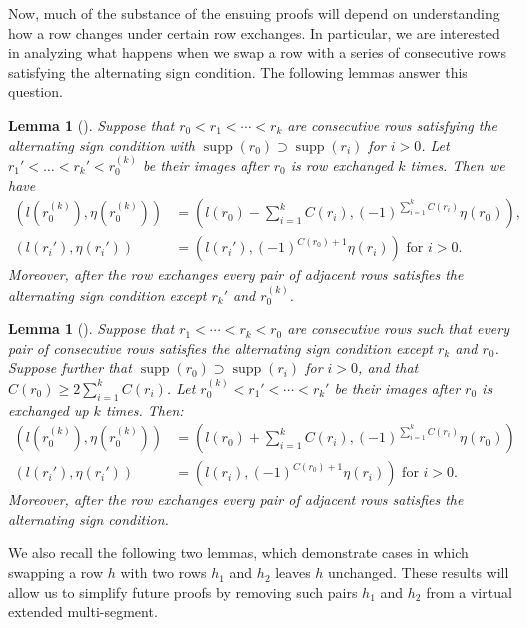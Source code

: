 \documentclass[11pt,letterpaper]{amsart}
\newtheorem{lemma}[thm]{Lemma}
\DeclareMathOperator{\supp}{supp}
\numberwithin{equation}{section}
\begin{document}
Now, much of the substance of the ensuing proofs will depend on understanding how a row changes under certain row exchanges. In particular, we are interested in analyzing what happens when we swap a row with a series of consecutive rows satisfying the alternating sign condition. The following lemmas answer this question.

\begin{lemma}[{\cite[Lemma 4.15]{HKT26}}]
\label{big swap down}
    Suppose that $r_0 < r_1 < \cdots < r_k$ are consecutive rows satisfying the alternating sign condition with $\supp(r_0) \supset \supp(r_i)$ for $i > 0$. Let $r_1' < \dots < r_k' < r_0^{(k)}$ be their images after $r_0$ is row exchanged $k$ times. Then we have
    \begin{align*}
        (l(r_0^{(k)}), \eta(r_0^{(k)})) &= \left(l(r_0) - \sum_{i=1}^k C(r_i), (-1)^{\sum_{i=1}^k C(r_i)} \eta(r_0) \right), \\
        (l(r_i'), \eta(r_i')) &= (l(r_i'), (-1)^{C(r_0)+1} \eta(r_i)) \text{ for } i >0.
    \end{align*}
    Moreover, after the row exchanges every pair of adjacent rows satisfies the alternating sign condition except $r_k'$ and $r_0^{(k)}$.
\end{lemma}

\begin{lemma}[{\cite[Lemma 4.16]{HKT26}}]
\label{big swap up}
    Suppose that $r_1 < \cdots < r_k < r_0$ are consecutive rows such that every pair of consecutive rows satisfies the alternating sign condition except $r_k$ and $r_0$. Suppose further that $\supp(r_0) \supset \supp(r_i)$ for $i > 0$, and that $C(r_0) \geq 2 \sum_{i = 1}^k C(r_i)$. Let $r_0^{(k)} < r_1' < \cdots < r_k'$ be their images after $r_0$ is exchanged up $k$ times. Then:
    \begin{align*}
        (l(r_0^{(k)}), \eta(r_0^{(k)})) &= \left(l(r_0) + \sum_{i=1}^k C(r_i), (-1)^{\sum_{i=1}^k C(r_i)} \eta(r_0) \right) \\
        (l(r_i'), \eta(r_i')) &= (l(r_i), (-1)^{C(r_0) + 1} \eta(r_i)) \text{ for } i > 0.
    \end{align*}
    Moreover, after the row exchanges every pair of adjacent rows satisfies the alternating sign condition.
\end{lemma}


We also recall the following two lemmas, which demonstrate cases in which swapping a row $h$ with two rows $h_1$ and $h_2$ leaves $h$ unchanged. These results will allow us to simplify future proofs by removing such pairs $h_1$ and $h_2$ from a virtual extended multi-segment.
\end{document}
